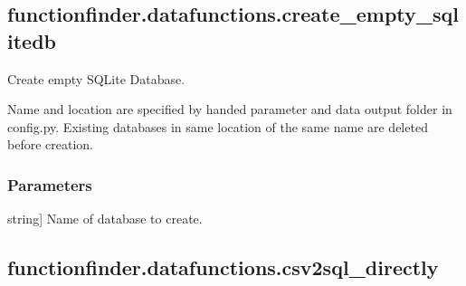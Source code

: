 \documentclass[letterpaper,10pt,english]{sphinxmanual}
\begin{document}
\sphinxstepscope


\subsection{functionfinder.datafunctions.create\_empty\_sqlitedb}
\label{\detokenize{_autosummary/functionfinder.datafunctions.create_empty_sqlitedb:functionfinder-datafunctions-create-empty-sqlitedb}}\label{\detokenize{_autosummary/functionfinder.datafunctions.create_empty_sqlitedb::doc}}

\begin{fulllineitems}
\label{\detokenize{_autosummary/functionfinder.datafunctions.create_empty_sqlitedb:functionfinder.datafunctions.create_empty_sqlitedb}}
\pysigstartsignatures
{}
\pysigstopsignatures
\sphinxAtStartPar
Create empty SQLite Database.

\sphinxAtStartPar
Name and location are specified by handed parameter and data output folder
in config.py. Existing databases in same location of the same name are
deleted before creation.


\subsubsection{Parameters}
\label{\detokenize{_autosummary/functionfinder.datafunctions.create_empty_sqlitedb:parameters}}\begin{description}
\sphinxlineitem{dbname}{[}string{]}
\sphinxAtStartPar
Name of database to create.

\end{description}

\end{fulllineitems}


\sphinxstepscope


\subsection{functionfinder.datafunctions.csv2sql\_directly}
\label{\detokenize{_autosummary/functionfinder.datafunctions.csv2sql_directly:functionfinder-datafunctions-csv2sql-directly}}\label{\detokenize{_autosummary/functionfinder.datafunctions.csv2sql_directly::doc}}
\end{document}
